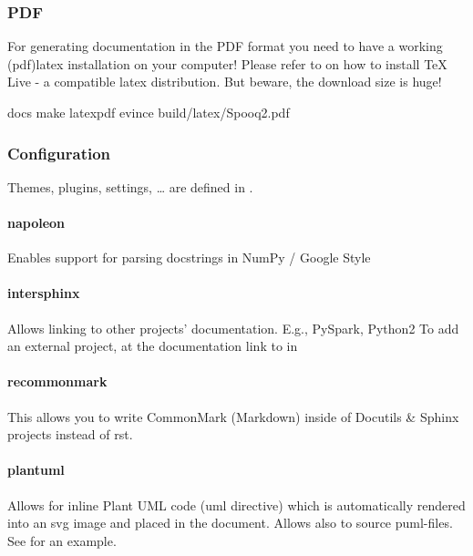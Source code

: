 \documentclass[a4paper,10pt, twoside,english]{sphinxmanual}
\begin{document}
\subsubsection{PDF}
\label{\detokenize{setup_development_testing:pdf}}
For generating documentation in the PDF format you need to have a working (pdf)latex installation
on your computer! Please refer to  on how to install
TeX Live - a compatible latex distribution. But beware, the download size is huge!

\begin{sphinxVerbatim}[commandchars=\\\{\}]
\PYGZdl{}  docs
\PYGZdl{} make latexpdf
\PYGZdl{} evince build/latex/Spooq2.pdf
\end{sphinxVerbatim}


\subsubsection{Configuration}
\label{\detokenize{setup_development_testing:configuration}}
Themes, plugins, settings, … are defined in .


\paragraph{napoleon}
\label{\detokenize{setup_development_testing:id6}}
Enables support for parsing docstrings in NumPy / Google Style


\paragraph{intersphinx}
\label{\detokenize{setup_development_testing:id7}}
Allows linking to other projects’ documentation. E.g., PySpark, Python2
To add an external project, at the documentation link to  in 


\paragraph{recommonmark}
\label{\detokenize{setup_development_testing:id8}}
This allows you to write CommonMark (Markdown) inside of Docutils \& Sphinx projects instead
of rst.


\paragraph{plantuml}
\label{\detokenize{setup_development_testing:id9}}
Allows for inline Plant UML code (uml directive) which is automatically rendered into an
svg image and placed in the document. Allows also to source puml-files. See {\hyperref[\detokenize{architecture:architecture}]{}}
for an example.
\end{document}
